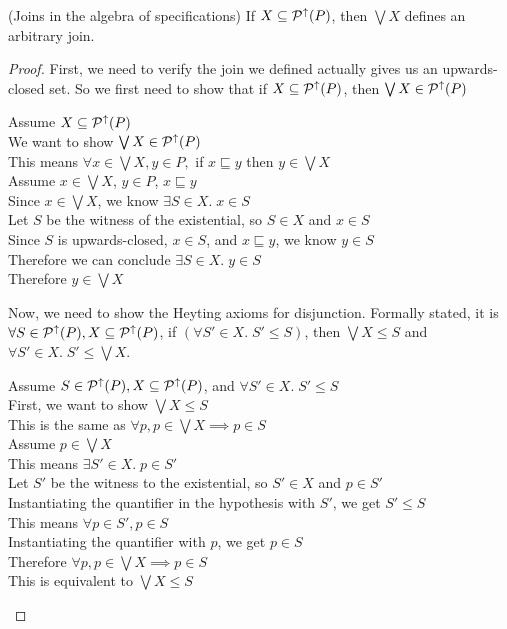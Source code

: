 \begin{lemma}{(Joins in the algebra of specifications)}
If $X \subseteq \mathcal{P}^{\uparrow}({P})$, then $\bigvee X$ defines an arbitrary join. 
\end{lemma}
\begin{proof}
First, we need to verify the join we defined actually gives us an upwards-closed set.
So we first need to show that if $X \subseteq \mathcal{P}^{\uparrow}({P})$, then $\bigvee{X} \in \mathcal{P}^{\uparrow}({P})$

\vspace{0.5em}

\begin{tabbedproof}
\oo Assume  $X \subseteq \mathcal{P}^{\uparrow}({P})$ \\
\ooo We want to show $\bigvee{X} \in \mathcal{P}^{\uparrow}({P})$ \\
\ooo This means $\forall x \in \bigvee{X}, y \in P,$ if $x \sqsubseteq y$ then $y \in \bigvee{X}$\\
\ooo Assume $x \in \bigvee X$, $y \in P$, $x \sqsubseteq y$ \\
\oooo Since $x \in \bigvee X$, we know $\exists S \in X.\; x \in S$ \\
\oooo Let $S$ be the witness of the existential, so $S \in X$ and $x \in S$ \\ 
\ooooo  Since $S$ is upwards-closed, $x \in S$, and $x \sqsubseteq y$, we know $y \in S$ \\
\ooo Therefore we can conclude $\exists S \in X.\; y \in S$ \\
\ooo Therefore $y \in \bigvee X$ \\
\end{tabbedproof}

\noindent Now, we need to show the Heyting axioms for disjunction. Formally stated, it is $\forall S \in \mathcal{P}^{\uparrow}({P}), X \subseteq
\mathcal{P}^{\uparrow}({P})$, if $(\forall S' \in X.\; S' \leq S)$, then $\bigvee X \leq
S$ and $\forall S' \in X.\; S' \leq \bigvee X$.

\vspace{0.5em}

\begin{tabbedproof}
\oo Assume $S \in \mathcal{P}^{\uparrow}({P}), X \subseteq \mathcal{P}^{\uparrow}({P})$, and $\forall S' \in X.\; S' \leq S$ \\
\ooo First, we want to show $\bigvee X \leq S$ \\
\oooo This is the same as $\forall p, p \in \bigvee X \implies p \in S$ \\
\oooo Assume $p \in \bigvee X$ \\
\ooooo This means $\exists S' \in X.\; p \in S'$ \\
\ooooo Let $S'$ be the witness to the existential, so $S' \in X$ and $p \in S'$ \\
\oooooo Instantiating the quantifier in the hypothesis with $S'$, we get $S' \leq S$ \\
\oooooo This means $\forall p \in S', p \in S$ \\
\oooooo Instantiating the quantifier with $p$, we  get $p \in S$ \\
\oooo Therefore $\forall p, p \in \bigvee X \implies p \in S$ \\
\oooo This is equivalent to $\bigvee X \leq S$ \\[1em]


\end{tabbedproof}
\end{proof}
